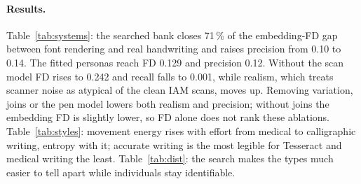 \paragraph{Results.} Table~\ref{tab:systems}: the searched bank closes 71\,\% of the embedding-FD gap between font rendering and real handwriting and raises precision from 0.10 to 0.14. The fitted personas reach FD 0.129 and precision 0.12. Without the scan model FD rises to 0.242 and recall falls to 0.001, while realism, which treats scanner noise as atypical of the clean IAM scans, moves up. Removing variation, joins or the pen model lowers both realism and precision; without joins the embedding FD is slightly lower, so FD alone does not rank these ablations. Table~\ref{tab:styles}: movement energy rises with effort from medical to calligraphic writing, entropy with it; accurate writing is the most legible for Tesseract and medical writing the least. Table~\ref{tab:dist}: the search makes the types much easier to tell apart while individuals stay identifiable.
